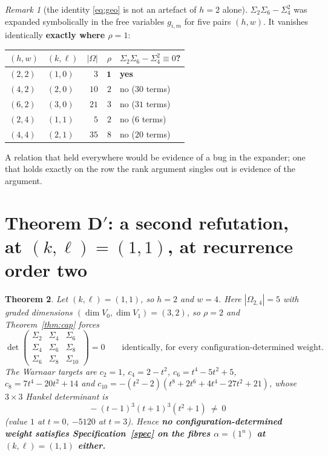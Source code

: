 \documentclass[11pt]{article}
\theoremstyle{plain}
\newtheorem{theorem}{Theorem}
\theoremstyle{definition}
\theoremstyle{remark}
\newtheorem{remark}[theorem]{Remark}
\begin{document}
\begin{remark}[the identity \eqref{eq:geo} is not an artefact of $h=2$ alone]
$\Sigma_2\Sigma_6-\Sigma_4^2$ was expanded symbolically in the free variables $g_{i,m}$ for five
pairs $(h,w)$. It vanishes identically \textbf{exactly where $\rho=1$}:
\begin{center}\small
\begin{tabular}{@{}llrrl@{}}
\toprule
$(h,w)$&$(k,\ell)$&$|\Omega|$&$\rho$&$\Sigma_2\Sigma_6-\Sigma_4^2\equiv0$?\\
\midrule
$(2,2)$&$(1,0)$&$3$&$\mathbf 1$&\textbf{yes}\\
$(4,2)$&$(2,0)$&$10$&$2$&no ($30$ terms)\\
$(6,2)$&$(3,0)$&$21$&$3$&no ($31$ terms)\\
$(2,4)$&$(1,1)$&$5$&$2$&no ($6$ terms)\\
$(4,4)$&$(2,1)$&$35$&$8$&no ($20$ terms)\\
\bottomrule
\end{tabular}
\end{center}
A relation that held everywhere would be evidence of a bug in the expander; one that holds
exactly on the row the rank argument singles out is evidence of the argument.
\end{remark}

\section{Theorem D$'$: a second refutation, at $(k,\ell)=(1,1)$, at recurrence order two}

\begin{theorem}\label{thm:kill2}
Let $(k,\ell)=(1,1)$, so $h=2$ and $w=4$. Here $|\Omega_{2,4}|=5$ with graded dimensions
$(\dim V_0,\dim V_1)=(3,2)$, so $\rho=2$ and Theorem~\ref{thm:cap} forces
\[
\det\begin{pmatrix}\Sigma_2&\Sigma_4&\Sigma_6\\ \Sigma_4&\Sigma_6&\Sigma_8\\ \Sigma_6&\Sigma_8&\Sigma_{10}\end{pmatrix}=0
\qquad\text{identically, for every configuration-determined weight.}
\]
The Warnaar targets are $c_2=1$, $c_4=2-t^2$, $c_6=t^4-5t^2+5$, $c_8=7t^4-20t^2+14$ and
$c_{10}=-(t^2-2)(t^8+2t^6+4t^4-27t^2+21)$, whose $3\times3$ Hankel determinant is
\[
\boxed{\ -(t-1)^3(t+1)^3(t^2+1)\ \neq\ 0\ }
\]
(value $1$ at $t=0$, $-5120$ at $t=3$). Hence \textbf{no configuration-determined weight
satisfies Specification~\ref{spec} on the fibres $\alpha=(1^n)$ at $(k,\ell)=(1,1)$ either.}
\end{theorem}
\end{document}

